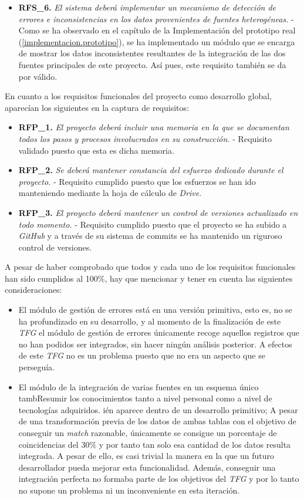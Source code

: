 \begin{itemize}
 \item \textbf{RFS\_6. } \textit{El sistema deberá implementar un mecanismo de detección de errores e inconsistencias en los datos provenientes de fuentes heterogéneas.} - Como se ha observado en el capítulo de la Implementación del prototipo real (\ref{implementacion.prototipo}), se ha implementado un módulo que se encarga de mostrar los datos inconsistentes resultantes de la integración de las dos fuentes principales de este proyecto. Así pues, este requisito también se da por válido. 
 \end{itemize}
 
 En cuanto a los requisitos funcionales del proyecto como desarrollo global, aparecían los siguientes en la captura de requisitos: 
\begin{itemize}
\item \textbf{RFP\_1. }
\textit{El proyecto deberá incluir una memoria en la que se documentan todos los pasos y procesos involucrados en su construcción.} - Requisito validado puesto que esta es dicha memoria. 
\item \textbf{RFP\_2. }
\textit{Se deberá mantener constancia del esfuerzo dedicado durante el proyecto.} - Requisito cumplido puesto que los esfuerzos se han ido manteniendo mediante la hoja de cálculo de \textit{Drive}.
\item \textbf{RFP\_3. }
\textit{El proyecto deberá mantener un control de versiones actualizado en todo momento. } - Requisito cumplido puesto que el proyecto se ha subido a \textit{GitHub} y a través de su sistema de commits se ha mantenido un riguroso control de versiones.
\end{itemize}
 
 A pesar de haber comprobado que todos y cada uno de los requisitos funcionales han sido cumplidos al 100\%, hay que mencionar y tener en cuenta las siguientes consideraciones:
\begin{itemize}
\item El módulo de gestión de errores está en una versión primitiva, esto es, no se ha profundizado en su desarrollo, y al momento de la finalización de este \textit{TFG} el módulo de gestión de errores únicamente recoge aquellos registros que no han podidos ser integrados, sin hacer ningún análisis posterior. A efectos de este \textit{TFG} no es un problema puesto que no era un aspecto que se perseguía. 
\item El módulo de la integración de varias fuentes en un esquema único tambResumir los conocimientos tanto a nivel personal como a nivel de tecnologías adquiridos.
ién aparece dentro de un desarrollo primitivo; A pesar de una transformación previa de los datos de ambas tablas con el objetivo de conseguir un \textit{match} razonable, únicamente se consigue un porcentaje de coincidencias del 30\% y por tanto tan solo esa cantidad de los datos resulta integrada. A pesar de ello, es casi trivial la manera en la que un futuro desarrollador pueda mejorar esta funcionalidad. Además, conseguir una integración perfecta no formaba parte de los objetivos del \textit{TFG} y por lo tanto no supone un problema ni un inconveniente en esta iteración.
\end{itemize}

